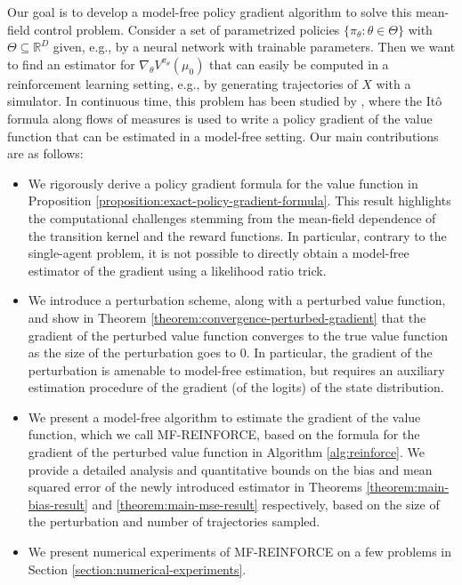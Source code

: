 \documentclass[11pt]{article}
\numberwithin{equation}{section}
\theoremstyle{definition}
\theoremstyle{remark}
\def \Th{\Theta} \def \Del{\Delta}
\def\R{{\mathbb R}}
\newcommand{\citet}{\cite}
\begin{document}
Our goal is to develop a model-free policy gradient algorithm to solve this mean-field control problem. Consider a set of parametrized policies $\{\pi_{\theta}: \theta \in \Theta \}$ with $\Th \subseteq \R^D$ given, e.g., by a neural network with trainable parameters. 
Then we want to find an estimator for $\nabla_{\theta} V^{\pi_{\theta}}(\mu_0)$ that can easily be computed in a reinforcement learning setting, e.g., by generating trajectories of $X$ with a simulator.
In continuous time, this problem has been studied by \citet{frikha2025actor}, where the It\^o formula along flows of measures is used to write a policy gradient of the value function that can be estimated in a model-free setting.
Our main contributions are as follows:
\begin{itemize}
    \item We rigorously derive a policy gradient formula for the value function in Proposition \ref{proposition:exact-policy-gradient-formula}. This result highlights the computational challenges stemming from the mean-field dependence of the transition kernel and the reward functions. In particular, contrary to the single-agent problem, it is not possible to directly obtain a model-free estimator of the gradient using a likelihood ratio trick.
    \item We introduce a perturbation scheme, along with a perturbed value function, and show in Theorem \ref{theorem:convergence-perturbed-gradient} that the gradient of the perturbed value function converges to the true value function as the size of the perturbation goes to $0$. In particular, the gradient of the perturbation is amenable to model-free estimation, but requires an auxiliary estimation procedure of the gradient (of the logits) of the state distribution.
    \item We present a model-free algorithm to estimate the gradient of the value function, which we call MF-REINFORCE, based on the formula for the gradient of the perturbed value function in Algorithm \ref{alg:reinforce}. We provide a detailed analysis and quantitative bounds on the bias and mean squared error of the newly introduced estimator in Theorems \ref{theorem:main-bias-result} and \ref{theorem:main-mse-result} respectively, based on the size of the perturbation and number of trajectories sampled.
    \item We present numerical experiments of MF-REINFORCE on a few problems in Section \ref{section:numerical-experiments}.
\end{itemize}
\end{document}
